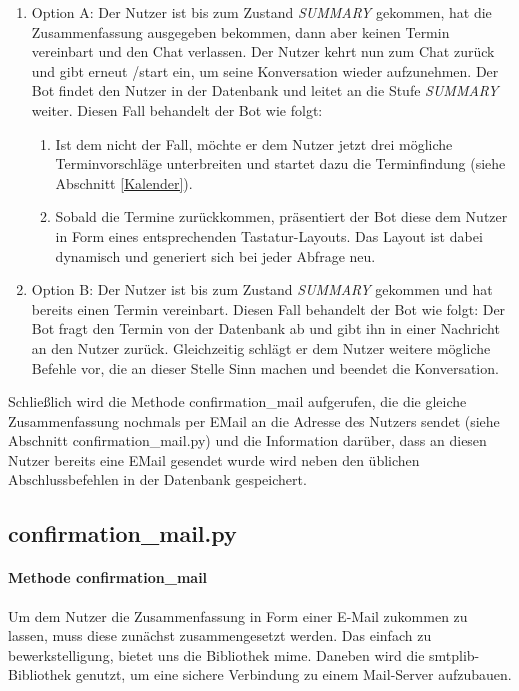                 \begin{enumerate}
                \item Option A:  Der Nutzer ist bis zum Zustand \emph{SUMMARY} gekommen, hat die Zusammenfassung ausgegeben bekommen, dann aber keinen Termin vereinbart und den Chat verlassen. Der Nutzer kehrt nun zum Chat zurück und gibt erneut /start ein, um seine Konversation wieder aufzunehmen. Der Bot findet den Nutzer in der Datenbank und leitet an die Stufe \emph{SUMMARY} weiter. 
                Diesen Fall behandelt der Bot wie folgt:
                    \begin{enumerate}
                        \item Ist dem nicht der Fall, möchte er dem Nutzer jetzt drei mögliche Terminvorschläge unterbreiten und startet dazu die Terminfindung (siehe Abschnitt \ref*{Kalender}). %
                        \item Sobald die Termine zurückkommen, präsentiert der Bot diese dem Nutzer in Form eines entsprechenden Tastatur-Layouts. Das Layout ist dabei dynamisch und generiert sich bei jeder Abfrage neu.
                    \end{enumerate}
                \item Option B: Der Nutzer ist bis zum Zustand \emph{SUMMARY} gekommen und hat bereits einen Termin vereinbart.
                Diesen Fall behandelt der Bot wie folgt:
                Der Bot fragt den Termin von der Datenbank ab und gibt ihn in einer Nachricht an den Nutzer zurück. Gleichzeitig schlägt er dem Nutzer weitere mögliche Befehle vor, die an dieser Stelle Sinn machen und beendet die Konversation.
                \end{enumerate}

            Schließlich wird die Methode confirmation\_mail aufgerufen, die die gleiche Zusammenfassung nochmals per E\-Mail an die Adresse des Nutzers sendet (siehe Abschnitt confirmation\_mail.py) und die Information darüber, dass an diesen Nutzer bereits eine E\-Mail gesendet wurde wird neben den üblichen Abschlussbefehlen in der Datenbank gespeichert.

                    
        \subsection{confirmation\_mail.py}
                \paragraph{Methode confirmation\_mail}
                    Um dem Nutzer die Zusammenfassung in Form einer E-Mail zukommen zu lassen, muss diese zunächst zusammengesetzt werden. Das einfach zu bewerkstelligung, bietet uns die Bibliothek mime. \cite{mime} Daneben wird die smtplib-Bibliothek genutzt, um eine sichere Verbindung zu einem Mail-Server aufzubauen. \cite{smtplib}

